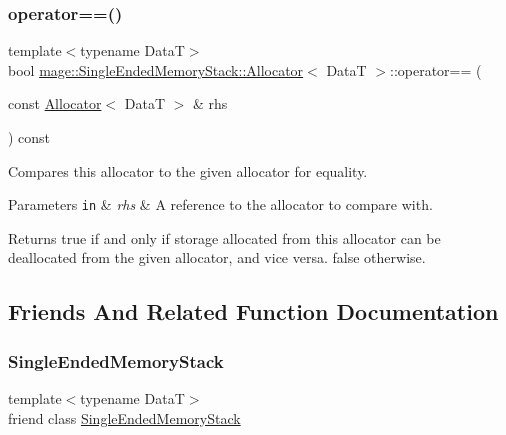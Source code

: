 \subsubsection{\texorpdfstring{operator==()}{operator==()}}
{\footnotesize\ttfamily template$<$typename DataT$>$ \\
bool \hyperlink{structmage_1_1_single_ended_memory_stack_1_1_allocator}{mage\+::\+Single\+Ended\+Memory\+Stack\+::\+Allocator}$<$ DataT $>$\+::operator== (\begin{DoxyParamCaption}\item[{const \hyperlink{structmage_1_1_single_ended_memory_stack_1_1_allocator}{Allocator}$<$ DataT $>$ \&}]{rhs }\end{DoxyParamCaption}) const\hspace{0.3cm}{\ttfamily [noexcept]}}

Compares this allocator to the given allocator for equality.


\begin{DoxyParams}[1]{Parameters}
\mbox{\tt in}  & {\em rhs} & A reference to the allocator to compare with. \\
\hline
\end{DoxyParams}
\begin{DoxyReturn}{Returns}
{\ttfamily true} if and only if storage allocated from this allocator can be deallocated from the given allocator, and vice versa. {\ttfamily false} otherwise. 
\end{DoxyReturn}


\subsection{Friends And Related Function Documentation}
\hypertarget{structmage_1_1_single_ended_memory_stack_1_1_allocator_a3f3449e5c2caa1666a293b36db6f5a54}{}\label{structmage_1_1_single_ended_memory_stack_1_1_allocator_a3f3449e5c2caa1666a293b36db6f5a54} 
\subsubsection{\texorpdfstring{Single\+Ended\+Memory\+Stack}{SingleEndedMemoryStack}}
{\footnotesize\ttfamily template$<$typename DataT$>$ \\
friend class \hyperlink{classmage_1_1_single_ended_memory_stack}{Single\+Ended\+Memory\+Stack}\hspace{0.3cm}{\ttfamily [friend]}}



